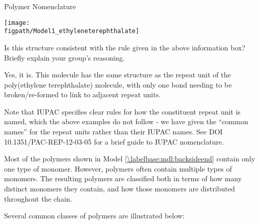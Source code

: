 \begin{activity}{Polymer Nomenclature}
\begin{ctqs}
		\centerline{\texttt{[image: \\figpath/Model1\_ethyleneterephthalate]}}
		
		Is this structure consistent with the rule given in the above information box?  Briefly explain your group's reasoning.
		
		\begin{solution}[0.75in]{}
			Yes, it is.  This molecule has the same structure as the repeat unit of the poly(ethylene terephthalate) molecule, with only one bond needing to be broken/re-formed to link to adjacent repeat units.
			
			Note that IUPAC specifies clear rules for how the constituent repeat unit is named, which the above examples do not follow - we have given the ``common names'' for the repeat units rather than their IUPAC names.  See DOI 10.1351/PAC-REP-12-03-05 for a brief guide to IUPAC nomenclature.
			
		\end{solution}

\end{ctqs}


\clearpage


\begin{model}[Composition]
\label{\labelbase:mdl:composition}

	Most of the polymers shown in Model \ref{\labelbase:mdl:backsideend} contain only one type of monomer.  However, polymers often contain multiple types of monomers.  The resulting polymers are classified both in terms of how many distinct monomers they contain, and how those monomers are distributed throughout the chain.
	
	Several common classes of polymers are illustrated below:
	

\end{model}
\end{activity}
